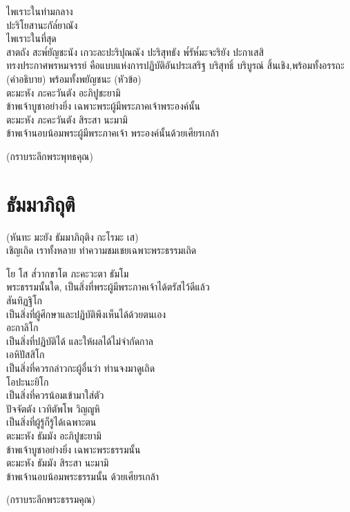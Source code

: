 \documentclass{article}
\begin{document}
\indent ไพเราะในท่ามกลาง\\
ปะริโยสานะกัล๎ยาณัง\\
\indent ไพเราะในที่สุด\\
สาตถัง สะพ๎ยัญชะนัง เกวะละปะริปุณณัง ปะริสุทธัง พ๎รัห๎มะจะริยัง ปะกาเสสิ\\
\indent ทรงประกาศพรหมจรรย์ คือแบบแห่งการปฏิบัติอันประเสริฐ บริสุทธิ์
บริบูรณ์ สิ้นเชิง,พร้อมทั้งอรรถะ (คำอธิบาย) พร้อมทั้งพยัญชนะ (หัวข้อ)\\
ตะมะหัง ภะคะวันตัง อะภิปูชะยามิ\\
\indent ข้าพเจ้าบูชาอย่างยิ่ง เฉพาะพระผู้มีพระภาคเจ้าพระองค์นั้น\\
ตะมะหัง ภะคะวันตัง สิระสา นะมามิ\\
\indent ข้าพเจ้านอบน้อมพระผู้มีพระภาคเจ้า พระองค์นั้นด้วยเศียรเกล้า
\begin{center}
(กราบระลึกพระพุทธคุณ)
\end{center}
\pagebreak
\section{ธัมมาภิถุติ}
\begin{center}
(หันทะ มะยัง ธัมมาภิถุติง กะโรมะ เส)\\
เชิญเถิด เราทั้งหลาย ทำความชมเชยเฉพาะพระธรรมเถิด
\end{center}
โย โส ส๎วากขาโต ภะคะวะตา ธัมโม\\
\indent พระธรรมนั้นใด, เป็นสิ่งที่พระผู้มีพระภาคเจ้าได้ตรัสไว้ดีแล้ว\\
สันทิฏฐิโก\\
\indent เป็นสิ่งที่ผู้ศึกษาและปฏิบัติพึงเห็นได้ด้วยตนเอง\\
อะกาลิโก\\
\indent เป็นสิ่งที่ปฏิบัติได้ และให้ผลได้ไม่จำกัดกาล\\
เอหิปัสสิโก\\
\indent เป็นสิ่งที่ควรกล่าวกะผู้อื่นว่า ท่านจงมาดูเถิด\\
โอปะนะยิโก\\
\indent เป็นสิ่งที่ควรน้อมเข้ามาใส่ตัว\\
ปัจจัตตัง เวทิตัพโพ วิญญูหิ\\
\indent เป็นสิ่งที่ผู้รู้ก็รู้ได้เฉพาะตน\\
ตะมะหัง ธัมมัง อะภิปูชะยามิ\\
\indent ข้าพเจ้าบูชาอย่างยิ่ง เฉพาะพระธรรมนั้น\\
ตะมะหัง ธัมมัง สิระสา นะมามิ\\
\indent ข้าพเจ้านอบน้อมพระธรรมนั้น ด้วยเศียรเกล้า
\begin{center}
(กราบระลึกพระธรรมคุณ)
\end{center}
\pagebreak
\end{document}
